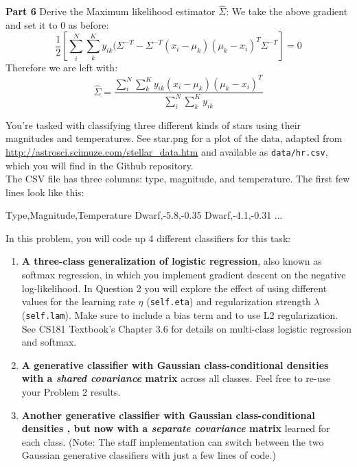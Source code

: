 \documentclass[submit]{harvardml}
\begin{document}
\item \textbf{Part 6} Derive the  Maximum likelihood estimator $\hat{\Sigma}$:
We take the above gradient and set it to 0 as before:\\
$$
    \frac{1}{2} \left[ \sum^N_i \sum^K_k y_{ik} ( \Sigma^{-T} - \Sigma^{-T}(x_i - \mu_k)(\mu_k - x_i)^{T}\Sigma^{-T}   \right] = 0
$$
Therefore we are left with:
$$
    \hat{\Sigma} = \frac{\sum^N_i \sum^K_k y_{ik} (x_i - \mu_k)(\mu_k - x_i)^{T}}{\sum^N_i \sum^K_k y_{ik}}
$$

\begin{problem}

You're tasked with classifying three different kinds of stars using their magnitudes and temperatures. See star.png for a plot of
the data, adapted from
\url{http://astrosci.scimuze.com/stellar_data.htm} and available as
\verb|data/hr.csv|, which you will find in the Github repository. \\

The CSV file has three columns: type, magnitude, and temperature. The
first few lines look like this:
\begin{csv}
Type,Magnitude,Temperature
Dwarf,-5.8,-0.35
Dwarf,-4.1,-0.31
...
\end{csv}

In this problem, you will code up 4 different classifiers for this task:
\begin{enumerate}[label=\alph*)]

\item \textbf{A three-class generalization of logistic regression}, also
  known as softmax regression, in which you implement gradient descent on the negative log-likelihood. In Question 2 you will explore the effect of using different values for the learning rate $\eta$ (\texttt{self.eta}) and
  regularization strength $\lambda$ (\texttt{self.lam}).  Make sure to include a bias term and to
  use L2 regularization. See CS181 Textbook's Chapter 3.6 for details on multi-class
  logistic regression and softmax.
  
\item \textbf{A generative classifier with Gaussian class-conditional
  densities with a \textit{shared covariance} matrix} across all classes. 
  Feel free to re-use your Problem 2 results.
\item \textbf{Another generative classifier with Gaussian class-conditional densities , but now 
with a \textit{separate covariance} matrix} learned for each class. (Note: 
The staff implementation can switch between the two Gaussian generative classifiers with just a
few lines of code.)


\end{enumerate}
\end{problem}
\end{document}

